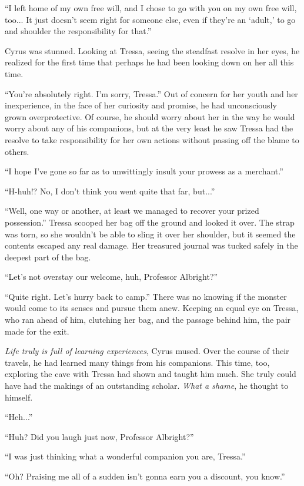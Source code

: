 ``I left home of my own free will, and I chose to go with you on my own free will, too... It just doesn't seem right for someone else, even if they're an `adult,' to go and shoulder the responsibility for that.''

Cyrus was stunned. Looking at Tressa, seeing the steadfast resolve in her eyes, he realized for the first time that perhaps he had been looking down on her all this time.

``You're absolutely right. I'm sorry, Tressa.'' Out of concern for her youth and her inexperience, in the face of her curiosity and promise, he had unconsciously grown overprotective. Of course, he should worry about her in the way he would worry about any of his companions, but at the very least he saw Tressa had the resolve to take responsibility for her own actions without passing off the blame to others.

``I hope I've gone so far as to unwittingly insult your prowess as a merchant.''

``H-huh!? No, I don't think you went quite that far, but...''

``Well, one way or another, at least we managed to recover your prized possession.'' Tressa scooped her bag off the ground and looked it over. The strap was torn, so she wouldn't be able to sling it over her shoulder, but it seemed the contents escaped any real damage. Her treasured journal was tucked safely in the deepest part of the bag.

``Let's not overstay our welcome, huh, Professor Albright?''

``Quite right. Let's hurry back to camp.'' There was no knowing if the monster would come to its senses and pursue them anew. Keeping an equal eye on Tressa, who ran ahead of him, clutching her bag, and the passage behind him, the pair made for the exit.

\emph{Life truly is full of learning experiences}, Cyrus mused. Over the course of their travels, he had learned many things from his companions. This time, too, exploring the cave with Tressa had shown and taught him much. She truly could have had the makings of an outstanding scholar. \emph{What a shame}, he thought to himself.

``Heh...''

``Huh? Did you laugh just now, Professor Albright?''

``I was just thinking what a wonderful companion you are, Tressa.''

``Oh? Praising me all of a sudden isn't gonna earn you a discount, you know.''

